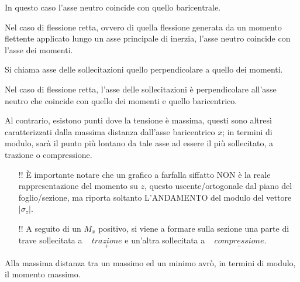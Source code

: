 		In questo caso l'asse neutro coincide con quello baricentrale. \newline
		
		Nel caso di flessione retta, ovvero di quella flessione generata da un momento flettente applicato lungo un asse principale di inerzia, l'asse neutro coincide con l'asse dei momenti. \newline 
		
		Si chiama asse delle sollecitazioni quello perpendicolare a quello dei momenti.
		
		Nel caso di flessione retta, l'asse delle sollecitazioni è perpendicolare all'asse neutro che coincide con quello dei momenti e quello baricentrico. \newline
		
		Al contrario, esistono punti dove la tensione è massima, questi sono altresì caratterizzati dalla massima distanza dall'asse baricentrico $x$; in termini di modulo, sarà il punto più lontano da tale asse ad essere il più sollecitato, a trazione o compressione. 
		
		\begin{itemize}
			\item[!!] È importante notare che un grafico a farfalla siffatto NON è la reale rappresentazione del momento su $z$, questo uscente/ortogonale dal piano del foglio/sezione, ma riporta soltanto L'ANDAMENTO del modulo del vettore $|\sigma_z|$. 
		
		\item[!!] A seguito di un $M_x$ positivo, si viene a formare sulla sezione una parte di trave sollecitata a ~ $  \underset{+}{trazione} $ e un'altra sollecitata a ~ $ \underset{-}{compressione} $.
		\end{itemize}

		Alla massima distanza tra un massimo ed un minimo avrò, in termini di modulo, il momento massimo. 

